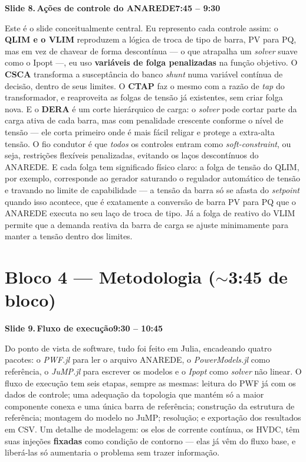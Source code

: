 \documentclass[11pt,a4paper]{article}
\newcommand{\slide}[3]{%
  \bigskip
  \noindent\colorbox{chipbg}{\parbox{\dimexpr\linewidth-2\fboxsep\relax}{%
    \textbf{\textcolor{ufcblue}{#1}}\,\textbf{#2}\hfill\textbf{\textcolor{ufcblue}{#3}}}}\par
  \nopagebreak\medskip
}
\begin{document}
\slide{Slide 8.}{Ações de controle do ANAREDE}{7:45 -- 9:30}
Este é o slide conceitualmente central. Eu represento cada controle assim: o \textbf{QLIM e o VLIM} reproduzem a lógica de troca de tipo de barra, PV para PQ, mas em vez de chavear de forma descontínua --- o que atrapalha um \textit{solver} suave como o Ipopt ---, eu uso \textbf{variáveis de folga penalizadas} na função objetivo. O \textbf{CSCA} transforma a susceptância do banco \textit{shunt} numa variável contínua de decisão, dentro de seus limites. O \textbf{CTAP} faz o mesmo com a razão de \textit{tap} do transformador, e reaproveita as folgas de tensão já existentes, sem criar folga nova. E o \textbf{DERA} é um corte hierárquico de carga: o \textit{solver} pode cortar parte da carga ativa de cada barra, mas com penalidade crescente conforme o nível de tensão --- ele corta primeiro onde é mais fácil religar e protege a extra-alta tensão. O fio condutor é que \emph{todos} os controles entram como \textit{soft-constraint}, ou seja, restrições flexíveis penalizadas, evitando os laços descontínuos do ANAREDE. E cada folga tem significado físico claro: a folga de tensão do QLIM, por exemplo, corresponde ao gerador saturando o regulador automático de tensão e travando no limite de capabilidade --- a tensão da barra só se afasta do \textit{setpoint} quando isso acontece, que é exatamente a conversão de barra PV para PQ que o ANAREDE executa no seu laço de troca de tipo. Já a folga de reativo do VLIM permite que a demanda reativa da barra de carga se ajuste minimamente para manter a tensão dentro dos limites.

\section*{\textcolor{ufcblue}{Bloco 4 --- Metodologia ($\sim$3:45 de bloco)}}

\slide{Slide 9.}{Fluxo de execução}{9:30 -- 10:45}
Do ponto de vista de software, tudo foi feito em Julia, encadeando quatro pacotes: o \textit{PWF.jl} para ler o arquivo ANAREDE, o \textit{PowerModels.jl} como referência, o \textit{JuMP.jl} para escrever os modelos e o \textit{Ipopt} como \textit{solver} não linear. O fluxo de execução tem seis etapas, sempre as mesmas: leitura do PWF já com os dados de controle; uma adequação da topologia que mantém só a maior componente conexa e uma única barra de referência; construção da estrutura de referência; montagem do modelo no JuMP; resolução; e exportação dos resultados em CSV. Um detalhe de modelagem: os elos de corrente contínua, os HVDC, têm suas injeções \textbf{fixadas} como condição de contorno --- elas já vêm do fluxo base, e liberá-las só aumentaria o problema sem trazer informação.
\end{document}
